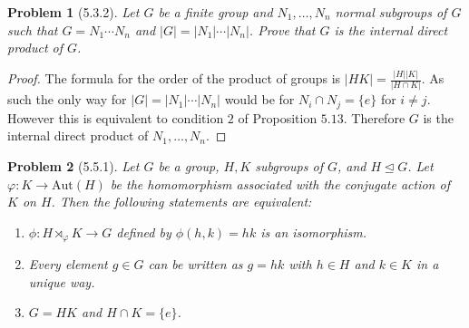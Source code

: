 \documentclass[10pt]{article}
\newcommand{\sk}{\vskip 10mm}
\theoremstyle{plain}
\newtheorem{problem}{Problem}
\theoremstyle{remark}
\begin{document}
\sk

\begin{problem}[5.3.2]
  Let $G$ be a finite group and $N_1,\ldots, N_n$ normal subgroups of $G$ such
  that $G=N_1\cdots N_n$ and $|G|=|N_1|\cdots|N_n|$. Prove that $G$ is the internal direct
  product of $G$.
\end{problem}

\begin{proof}
  The formula for the order of the product of groups is
  $|HK|=\frac{|H||K|}{|H\cap K|}$. As such the only way for
  $|G|=|N_1|\cdots|N_n|$ would be for $N_i\cap N_j=\{e\}$ for $i\neq j$.
  However this is equivalent to condition $2$ of Proposition
  $5.13$. Therefore $G$ is the internal direct product of
  $N_1,\ldots,N_n$.
\end{proof}

\sk

\begin{problem}[5.5.1]
  Let $G$ be a group, $H,K$ subgroups of $G$, and $H\trianglelefteq G$. Let
  $\varphi:K\rightarrow \text{Aut}(H)$ be the homomorphism associated with the conjugate
  action of $K$ on $H$. Then the following statements are equivalent:
  \begin{enumerate}
  \item $\phi:H\rtimes_\varphi K\rightarrow G$ defined by $\phi(h,k)=hk$ is an isomorphism.
  \item Every element $g\in G$ can be written as $g=hk$ with $h\in H$ and $k\in K$
    in a unique way.
  \item $G=HK$ and $H\cap K=\{e\}$.
  \end{enumerate}
\end{problem}
\end{document}
